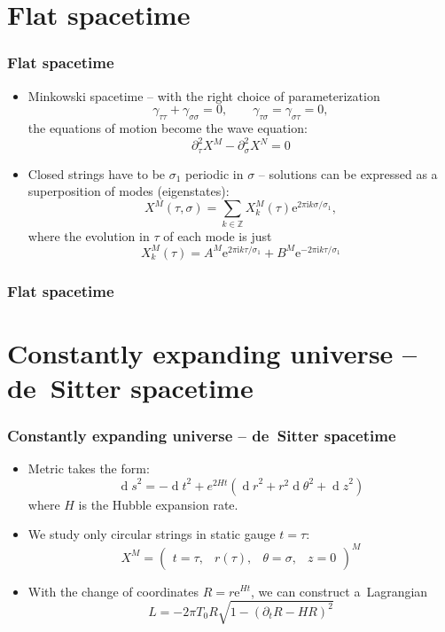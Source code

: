 \documentclass[11pt]{beamer}
\newcommand{\Zbb}{\mathbb{Z}}
\newcommand{\D}[1]{\ensuremath{\operatorname{d}\!{#1}}}
\newcommand{\difs}[3][]{\partial_{#3}^{#1}{#2}}
\newcommand{\me}{\mathrm{e}}
\newcommand{\mi}{\mathrm{i}}
\newcommand{\lp}{\left(}
\newcommand{\rp}{\right)}
\begin{document}
\section{Flat spacetime}


\begin{frame}
	\frametitle{Flat spacetime}
	\begin{itemize}
		\item Minkowski spacetime -- with the right choice of parameterization
		$$
		\gamma_{\tau \tau} + \gamma_{\sigma \sigma} = 0, \qquad \gamma_{\tau \sigma} = \gamma_{\sigma \tau} = 0,
		$$
		the equations of motion become the wave equation:
		$$
		\difs[2] {X^M} {\tau} - \difs[2] {X^N} {\sigma} = 0
		$$
		\pause
		\item Closed strings have to be $\sigma_1$ periodic in $\sigma$ -- solutions can be expressed as a superposition of modes (eigenstates):
		$$
		X^{M}(\tau, \sigma) = \sum\limits_{k \in \Zbb} X_k^M(\tau) \me^{2 \pi \mi k \sigma / \sigma_1 },
		$$
		where the evolution in $\tau$ of each mode is just 
		$$
		X_k^M(\tau) = A^M \me^{2 \pi \mi k \tau / \sigma_1 } + B^M \me^{-2 \pi \mi k \tau / \sigma_1 }
		$$
	\end{itemize}
\end{frame}


\begin{frame}
	\frametitle{Flat spacetime}
	\begin{center}
	\end{center}
\end{frame}


\section{Constantly expanding universe -- de~Sitter spacetime}

\begin{frame}
	\frametitle{Constantly expanding universe -- de~Sitter spacetime}
	\begin{itemize}
		\item Metric takes the form:
		$$		
		\D s^2 = -\D t^2 + e^{2Ht} \lp \D r^2 + r^2 \D \theta^2 + \D z^2 \rp
		$$
		where $H$ is the Hubble expansion rate.
		\pause
		\item We study only circular strings in static gauge $t = \tau$:
		$$
		X^M = 
		\begin{pmatrix} 
		t = \tau, & r(\tau), & \theta = \sigma, & z = 0
		\end{pmatrix}^M
		$$
		\item With the change of coordinates $R = r \me^{Ht}$, we can construct a~Lagrangian
		$$
		L = - 2 \pi T_0 R \sqrt{1- \lp \difs[]{R}{t} - H R \rp ^2}
		$$
	\end{itemize}
\end{frame}
\end{document}
